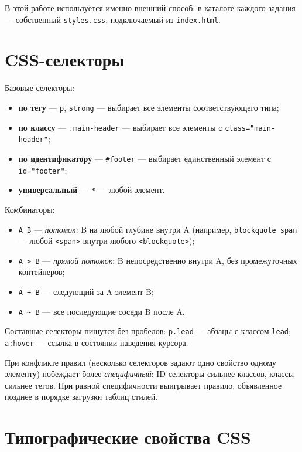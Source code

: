 В этой работе используется именно внешний способ: в каталоге каждого
задания --- собственный \texttt{styles.css}, подключаемый из
\texttt{index.html}.

\section{CSS-селекторы}

Базовые селекторы:
\begin{itemize}
  \item \textbf{по тегу} --- \texttt{p}, \texttt{strong} ---
        выбирает все элементы соответствующего типа;
  \item \textbf{по классу} --- \texttt{.main-header} ---
        выбирает все элементы с \texttt{class="main-header"};
  \item \textbf{по идентификатору} --- \texttt{\#footer} ---
        выбирает единственный элемент с \texttt{id="footer"};
  \item \textbf{универсальный} --- \texttt{*} --- любой элемент.
\end{itemize}

Комбинаторы:
\begin{itemize}
  \item \texttt{A~B} --- \emph{потомок}: B на любой глубине
        внутри A (например, \texttt{blockquote~span} --- любой
        \texttt{<span>} внутри любого \texttt{<blockquote>});
  \item \texttt{A~>~B} --- \emph{прямой потомок}: B
        непосредственно внутри A, без промежуточных
        контейнеров;
  \item \texttt{A~+~B} --- следующий за A элемент B;
  \item \texttt{A~\textasciitilde~B} --- все последующие соседи B
        после A.
\end{itemize}

Составные селекторы пишутся без пробелов: \texttt{p.lead} ---
абзацы с классом \texttt{lead}; \texttt{a:hover} --- ссылка в
состоянии наведения курсора.

При конфликте правил (несколько селекторов задают одно свойство
одному элементу) побеждает более \emph{специфичный}: ID-селекторы
сильнее классов, классы сильнее тегов. При равной специфичности
выигрывает правило, объявленное позднее в порядке загрузки таблиц
стилей.

\section{Типографические свойства CSS}

